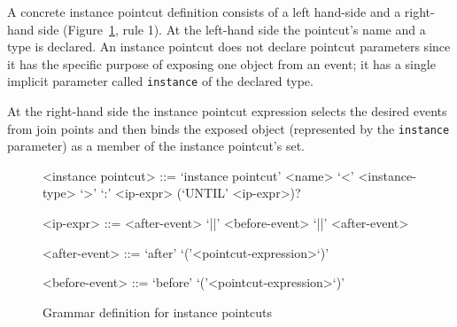 \documentclass{acm_proc_article-sp}
\newcommand{\lstinln}[1]{\lstinline~#1~}
\begin{document}
A concrete instance pointcut definition consists of a left hand-side and a right-hand side (Figure~\ref{fig:grammar1}, rule 1). 
At the left-hand side the pointcut's name and a type is declared. 
An instance pointcut does not declare pointcut parameters since it has the specific purpose of exposing one object from an event; it has a single implicit parameter called \lstinln{instance} of the declared type. 

At the right-hand side the instance pointcut expression selects the desired events from join points and then binds the exposed object (represented by the \lstinln{instance} parameter) as a member of the instance pointcut's set. 

\begin{figure}[h!]
\begin{grammar}
<instance pointcut> ::= `instance pointcut' <name> `<' <instance-type> `>' `:'
<ip-expr> (`UNTIL' <ip-expr>)? 

<ip-expr> ::= <after-event> `||' <before-event>  `||' <after-event>  

<after-event> ::= `after' `('<pointcut-expression>`)'

<before-event> ::= `before' `('<pointcut-expression>`)'
\end{grammar}
\caption{Grammar definition for instance pointcuts}
\label{fig:grammar1}
\end{figure}

\end{document}
